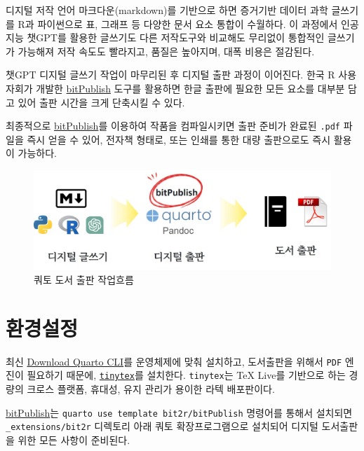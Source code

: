 \documentclass[
  letterpaper,
]{book}
\begin{document}
디지털 저작 언어 마크다운(markdown)를 기반으로 하면 증거기반 데이터 과학
글쓰기를 R과 파이썬으로 표, 그래프 등 다양한 문서 요소 통합이 수월하다.
이 과정에서 인공지능 챗GPT를 활용한 글쓰기도 다른 저작도구와 비교해도
무리없이 통합적인 글쓰기가 가능해져 저작 속도도 빨라지고, 품질은
높아지며, 대폭 비용은 절감된다.

챗GPT 디지털 글쓰기 작업이 마무리된 후 디지털 출판 과정이 이어진다. 한국
R 사용자회가 개발한
\href{https://github.com/bit2r/bitPublish}{bitPublish} 도구를 활용하면
한글 출판에 필요한 모든 요소를 대부분 담고 있어 출판 시간을 크게
단축시킬 수 있다.

최종적으로 \href{https://github.com/bit2r/bitPublish}{bitPublish}를
이용하여 작품을 컴파일시키면 출판 준비가 완료된 \texttt{.pdf} 파일을
즉시 얻을 수 있어, 전자책 형태로, 또는 인쇄를 통한 대량 출판으로도 즉시
활용이 가능하다.

\begin{figure}

{\centering \includegraphics{images/bitPublish_workflow.jpg}

}

\caption{쿼토 도서 출판 작업흐름}

\end{figure}

\hypertarget{uxd658uxacbduxc124uxc815-1}{%
\section{환경설정}\label{uxd658uxacbduxc124uxc815-1}}

최신 \href{https://quarto.org/docs/get-started/}{Download Quarto CLI}를
운영체제에 맞춰 설치하고, 도서출판을 위해서 \texttt{PDF} 엔진이 필요하기
때문에, \href{https://yihui.org/tinytex/}{\texttt{tinytex}}를 설치한다.
\texttt{tinytex}는 TeX Live를 기반으로 하는 경량의 크로스 플랫폼,
휴대성, 유지 관리가 용이한 라텍 배포판이다.

\href{https://github.com/bit2r/bitPublish}{bitPublish}는
\texttt{quarto\ use\ template\ bit2r/bitPublish} 명령어를 통해서
설치되면 \texttt{\_extensions/bit2r} 디렉토리 아래 쿼토 확장프로그램으로
설치되어 디지털 도서출판을 위한 모든 사항이 준비된다.
\end{document}

